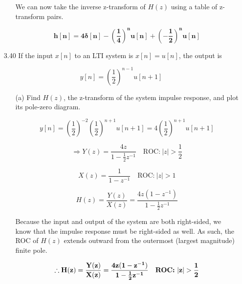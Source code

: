 \documentclass[fleqn]{article}
\makeatletter
\newenvironment{equationCenter}{\@fleqnfalse\begin{equation*}}{\end{equation*}}
\makeatother
\begin{document}
\begin{enumerate}[nolistsep]
\begin{enumerate}[nolistsep]
					We can now take the inverse z-transform of $H(z)$ using a table of z-transform pairs.
					
					\begin{equation*}
						\mathbf{h[n] = 4\delta[n] - \left(\frac{1}{4}\right)^nu[n] + \left(-\frac{1}{2}\right)^nu[n]}
					\end{equation*}
					
				\end{enumerate}
				
			\item[3.40] If the input $x[n]$ to an LTI system is $x[n] = u[n]$, the output is
				
				\begin{equationCenter}
					y[n] = \left(\frac{1}{2}\right)^{n-1}u[n+1]
				\end{equationCenter}
					
				\begin{enumerate}[nolistsep]
					\item[(a)] Find $H(z)$, the z-transform of the system impulse response, and plot its pole-zero diagram.
					
						\begin{equation*}
							y[n] = \left(\frac{1}{2}\right)^{-2}\left(\frac{1}{2}\right)^{n+1}u[n+1] = 4\left(\frac{1}{2}\right)^{n+1}u[n+1]
						\end{equation*}
						
						\begin{equation*}
							\Rightarrow Y(z) = \frac{4z}{1 - \frac{1}{2}z^{-1}}\quad \text{ROC:}\ |z| > \frac{1}{2}
						\end{equation*}
						
						\begin{equation*}
							X(z) = \frac{1}{1 - z^{-1}} \quad \text{ROC:}\ |z| > 1
						\end{equation*}
						
						\begin{equation*}
							H(z) = \frac{Y(z)}{X(z)} = \frac{4z(1 - z^{-1})}{1 - \frac{1}{2}z^{-1}}
						\end{equation*}
						
						Because the input and output of the system are both right-sided, we know that the impulse response must be right-sided as well. As such, the ROC of $H(z)$ extends outward from the outermost (largest magnitude) finite pole.
					
						\begin{equation*}
							\mathbf{\therefore H(z) = \frac{Y(z)}{X(z)} = \frac{4z(1 - z^{-1})}{1 - \frac{1}{2}z^{-1}}\quad \text{\textbf{ROC:}}\ |z| > \frac{1}{2}}
						\end{equation*}
						

\end{enumerate}
\end{enumerate}
\end{document}
